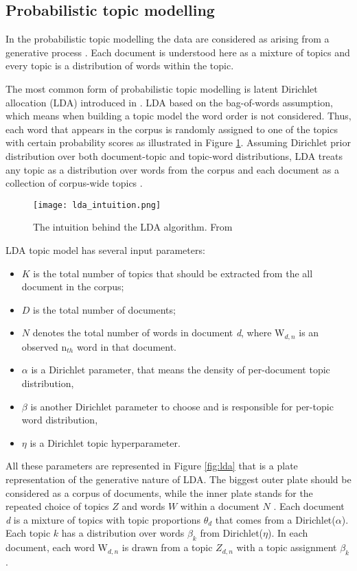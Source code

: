 \documentclass[fontsize=12pt,a4paper,twoside,openany]{scrbook}
\begin{document}
\subsection{Probabilistic topic modelling}
\label{sec:lda}

In the probabilistic topic modelling the data are considered as arising from a generative process \parencite{Blei12}. Each document is understood here as a mixture of topics and every topic is a distribution of words within the topic. 

The most common form of probabilistic topic modelling is latent Dirichlet allocation (LDA) introduced in \parencite{Blei03}. LDA based on the bag-of-words assumption, which means when building a topic model the word order is not considered. Thus, each word that appears in the corpus is randomly assigned to one of the topics  with certain probability scores as illustrated in Figure \ref{fig:lda_intuition}. Assuming Dirichlet prior distribution over both document-topic and topic-word distributions, LDA treats any topic as a distribution over words from the corpus and each document as a collection of corpus-wide topics \parencite{Blei03}.

\begin{figure}[h]
\centering
\texttt{[image: lda\_intuition.png]}
\caption{The intuition behind the LDA algorithm. From \parencite{Blei12}}
\label{fig:lda_intuition}
\end{figure}

LDA topic model has several input parameters:
\begin{itemize}
  \item \(K\) is the total number of topics that should be extracted from the all document in the corpus;
  \item \(D\) is the total number of documents;
  \item \(N\) denotes the total number of words in document \emph{d}, where W\(_{d,n}\) is an observed n\(_{th}\) word in that document.
  \item \(\alpha\) is a Dirichlet parameter, that means the density of per-document topic distribution,
  \item \(\beta\) is another Dirichlet parameter to choose and is responsible for per-topic word distribution,
  \item \(\eta\) is a Dirichlet topic hyperparameter.
\end{itemize}

All these parameters are represented in Figure \ref{fig:lda} that is a plate representation of the generative nature of LDA. The biggest outer plate should be considered as a corpus of documents, while the inner plate stands for the repeated choice of topics \(Z\) and words \(W\) within a document \(N\) \parencite[see also][p.~997]{Blei12}. Each document \emph{d} is a mixture of topics with topic proportions \(\theta_{d}\) that comes from a Dirichlet(\(\alpha\)). Each topic \(k\) has a distribution over words \(\beta_{k}\) from Dirichlet(\(\eta\)). In each document, each word W\(_{d,n}\) is drawn from a topic \(Z_{d,n}\) with a topic assignment \(\beta_{k}\). 
\end{document}
